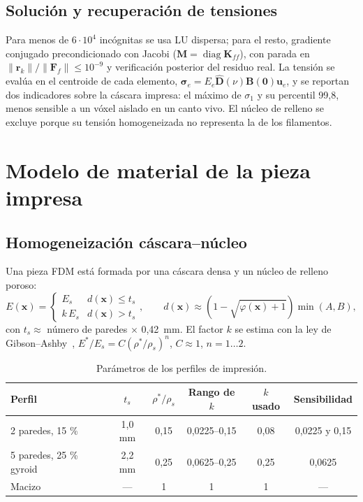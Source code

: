 \documentclass[11pt,a4paper]{article}
\newcommand{\sone}{\sigma_1}
\begin{document}
\subsection{Solución y recuperación de tensiones}
Para menos de $6\cdot10^4$ incógnitas se usa LU dispersa; para el resto, gradiente conjugado precondicionado con Jacobi ($\mathbf M=\operatorname{diag}\mathbf K_{ff}$), con parada en $\|\mathbf r_k\|/\|\mathbf F_f\|\le10^{-9}$ y verificación posterior del residuo real. La tensión se evalúa en el centroide de cada elemento, $\bm\sigma_e=E_e\hat{\mathbf D}(\nu)\mathbf B(\mathbf 0)\mathbf u_e$, y se reportan dos indicadores sobre la cáscara impresa: el máximo de $\sone$ y su percentil 99,8, menos sensible a un vóxel aislado en un canto vivo. El núcleo de relleno se excluye porque su tensión homogeneizada no representa la de los filamentos.

\section{Modelo de material de la pieza impresa}
\subsection{Homogeneización cáscara--núcleo}
Una pieza FDM está formada por una cáscara densa y un núcleo de relleno poroso:
\begin{equation}
E(\mathbf x)=\begin{cases}E_s & d(\mathbf x)\le t_s\\ k\,E_s & d(\mathbf x)>t_s\end{cases},\qquad
d(\mathbf x)\approx\left(1-\sqrt{\varphi(\mathbf x)+1}\right)\min(A,B),
\end{equation}
con $t_s\approx$ número de paredes $\times$ 0,42~mm. El factor $k$ se estima con la ley de Gibson--Ashby~\cite{gibson}, $E^*/E_s=C(\rho^*/\rho_s)^n$, $C\approx1$, $n=1\ldots2$.

\begin{table}[htbp]\centering\small
\caption{Parámetros de los perfiles de impresión.}
\begin{tabular}{lccccc}\toprule
Perfil & $t_s$ & $\rho^*/\rho_s$ & Rango de $k$ & $k$ usado & Sensibilidad\\\midrule
2 paredes, 15 \% & 1,0 mm & 0,15 & 0,0225--0,15 & 0,08 & 0,0225 y 0,15\\
5 paredes, 25 \% gyroid & 2,2 mm & 0,25 & 0,0625--0,25 & 0,25 & 0,0625\\
Macizo & — & 1 & 1 & 1 & —\\\bottomrule
\end{tabular}\end{table}
\end{document}
